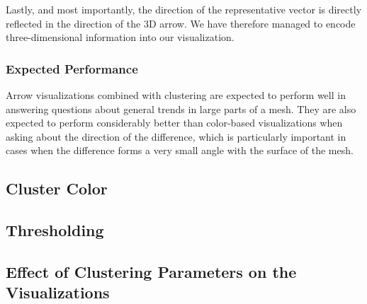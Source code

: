 Lastly, and most importantly, the direction of the representative vector is directly reflected in the direction of the 3D arrow. We have therefore managed to encode three-dimensional information into our visualization.

\subsubsection{Expected Performance}

Arrow visualizations combined with clustering are expected to perform well in answering questions about general trends in large parts of a mesh. They are also expected to perform considerably better than color-based visualizations when asking about the direction of the difference, which is particularly important in cases when the difference forms a very small angle with the surface of the mesh.
\subsection{Cluster Color}

\subsection{Thresholding}

\subsection{Effect of Clustering Parameters on the Visualizations}
